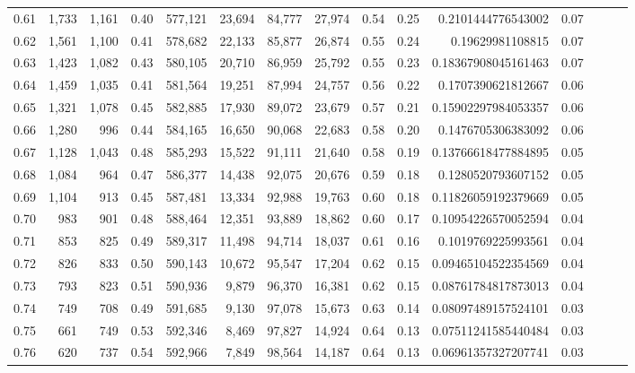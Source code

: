\begin{tabular}{rrrrrrrrrrrrrrr}
0.61 &   1,733 &  1,161 &  0.40 &  577,121 &   23,694 &   84,777 &   27,974 &  0.54 &  0.25 &    0.2101444776543002 &      0.07 \\
0.62 &   1,561 &  1,100 &  0.41 &  578,682 &   22,133 &   85,877 &   26,874 &  0.55 &  0.24 &      0.19629981108815 &      0.07 \\
0.63 &   1,423 &  1,082 &  0.43 &  580,105 &   20,710 &   86,959 &   25,792 &  0.55 &  0.23 &   0.18367908045161463 &      0.07 \\
0.64 &   1,459 &  1,035 &  0.41 &  581,564 &   19,251 &   87,994 &   24,757 &  0.56 &  0.22 &    0.1707390621812667 &      0.06 \\
0.65 &   1,321 &  1,078 &  0.45 &  582,885 &   17,930 &   89,072 &   23,679 &  0.57 &  0.21 &   0.15902297984053357 &      0.06 \\
0.66 &   1,280 &    996 &  0.44 &  584,165 &   16,650 &   90,068 &   22,683 &  0.58 &  0.20 &    0.1476705306383092 &      0.06 \\
0.67 &   1,128 &  1,043 &  0.48 &  585,293 &   15,522 &   91,111 &   21,640 &  0.58 &  0.19 &   0.13766618477884895 &      0.05 \\
0.68 &   1,084 &    964 &  0.47 &  586,377 &   14,438 &   92,075 &   20,676 &  0.59 &  0.18 &    0.1280520793607152 &      0.05 \\
0.69 &   1,104 &    913 &  0.45 &  587,481 &   13,334 &   92,988 &   19,763 &  0.60 &  0.18 &   0.11826059192379669 &      0.05 \\
0.70 &     983 &    901 &  0.48 &  588,464 &   12,351 &   93,889 &   18,862 &  0.60 &  0.17 &   0.10954226570052594 &      0.04 \\
0.71 &     853 &    825 &  0.49 &  589,317 &   11,498 &   94,714 &   18,037 &  0.61 &  0.16 &    0.1019769225993561 &      0.04 \\
0.72 &     826 &    833 &  0.50 &  590,143 &   10,672 &   95,547 &   17,204 &  0.62 &  0.15 &   0.09465104522354569 &      0.04 \\
0.73 &     793 &    823 &  0.51 &  590,936 &    9,879 &   96,370 &   16,381 &  0.62 &  0.15 &   0.08761784817873013 &      0.04 \\
0.74 &     749 &    708 &  0.49 &  591,685 &    9,130 &   97,078 &   15,673 &  0.63 &  0.14 &   0.08097489157524101 &      0.03 \\
0.75 &     661 &    749 &  0.53 &  592,346 &    8,469 &   97,827 &   14,924 &  0.64 &  0.13 &   0.07511241585440484 &      0.03 \\
0.76 &     620 &    737 &  0.54 &  592,966 &    7,849 &   98,564 &   14,187 &  0.64 &  0.13 &   0.06961357327207741 &      0.03 \\

\end{tabular}
